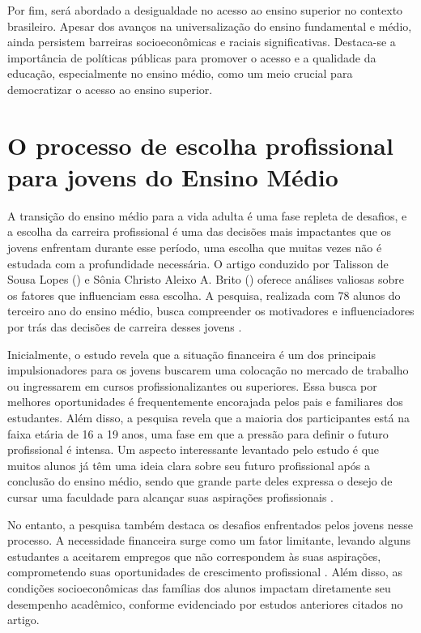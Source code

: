 Por fim, será abordado a desigualdade no acesso ao ensino superior no contexto brasileiro. Apesar dos avanços na universalização do ensino fundamental e médio, ainda persistem barreiras socioeconômicas e raciais significativas. Destaca-se a importância de políticas públicas para promover o acesso e a qualidade da educação, especialmente no ensino médio, como um meio crucial para democratizar o acesso ao ensino superior.



\section{O processo de escolha profissional para jovens do Ensino Médio}

A transição do ensino médio para a vida adulta é uma fase repleta de desafios, e a escolha da carreira profissional é uma das decisões mais impactantes que os jovens enfrentam durante esse período, uma escolha que muitas vezes não é estudada com a profundidade necessária. O artigo conduzido por Talisson de Sousa Lopes (\citeyear{lopes2022fim}) e Sônia Christo Aleixo A. Brito (\citeyear{lopes2022fim}) oferece análises valiosas sobre os fatores que influenciam essa escolha. A pesquisa, realizada com 78 alunos do terceiro ano do ensino médio, busca compreender os motivadores e influenciadores por trás das decisões de carreira desses jovens \cite{lopes2022fim}.

Inicialmente, o estudo revela que a situação financeira é um dos principais impulsionadores para os jovens buscarem uma colocação no mercado de trabalho ou ingressarem em cursos profissionalizantes ou superiores. Essa busca por melhores oportunidades é frequentemente encorajada pelos pais e familiares dos estudantes.
Além disso, a pesquisa revela que a maioria dos participantes está na faixa etária de 16 a 19 anos, uma fase em que a pressão para definir o futuro profissional é intensa. Um aspecto interessante levantado pelo estudo é que muitos alunos já têm uma ideia clara sobre seu futuro profissional após a conclusão do ensino médio, sendo que grande parte deles expressa o desejo de cursar uma faculdade para alcançar suas aspirações profissionais \cite{lopes2022fim}.

No entanto, a pesquisa também destaca os desafios enfrentados pelos jovens nesse processo. A necessidade financeira surge como um fator limitante, levando alguns estudantes a aceitarem empregos que não correspondem às suas aspirações, comprometendo suas oportunidades de crescimento profissional \cite{lopes2022fim}. Além disso, as condições socioeconômicas das famílias dos alunos impactam diretamente seu desempenho acadêmico, conforme evidenciado por estudos anteriores citados no artigo.

